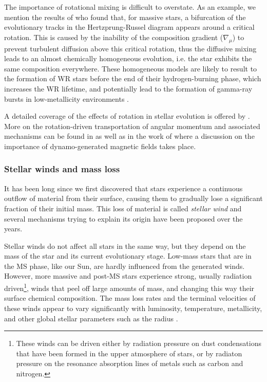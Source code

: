 \documentclass[../../main/thesis_msc.tex]{subfiles}
\begin{document}
						The importance of rotational mixing is difficult to overstate. As an example, we mention the results of \cite{Maeder1987} who found that, for massive stars, a bifurcation of the evolutionary tracks in the Hertzprung-Russel diagram appears around a critical rotation. This is caused by the inability of the composition gradient ($\nabla_{\mu}$) to prevent turbulent diffusion above this critical rotation, thus the diffusive mixing leads to an almost chemically homogeneous evolution, i.e. the star exhibits the same composition everywhere. These homogeneous models are likely to result to the formation of WR stars before the end of their hydrogen-burning phase, which increases the WR lifetime, and potentially lead to the formation of gamma-ray bursts in low-metallicity environments \citep{Yoon2005}.
						
						A detailed coverage of the effects of rotation in stellar evolution is offered by \cite{Langer1997, Heger2000, Hirschi, Maeder2006, langer12, Palacios}. More on the rotation-driven transportation of angular momentum and associated mechanisms can be found in \cite{Heger2005, langer12} as well as in the work of \cite{Spruit2002} where a discussion on the importance of dynamo-generated magnetic fields takes place.
						
						
						
						
					\subsubsection{Stellar winds and mass loss}
					
						It has been long since we first discovered that stars experience a continuous outflow of material from their surface, causing them to gradually lose a significant fraction of their initial mass. This loss of material is called \emph{stellar wind} and several mechanisms trying to explain its origin have been proposed over the years.
						
						Stellar winds do not affect all stars in the same way, but they depend on the mass of the star and its current evolutionary stage. Low-mass stars that are in the MS phase, like our Sun, are hardly influenced from the generated winds. However, more massive and post-MS stars experience strong, usually radiation driven\footnote{These winds can be driven either by radiation pressure on dust condensations that have been formed in the upper atmosphere of stars, or by radiaton pressure on the resonance absorption lines of metals such as carbon and nitrogen.}, winds that peel off large amounts of mass, and changing this way their surface chemical composition. The mass loss rates and the terminal velocities of these winds appear to vary significantly with luminosity, temperature, metallicity, and other global stellar parameters such as the radius \citep{Hamann1982, deJager1988, Nugis2000, yoon17}.
						
\end{document}
